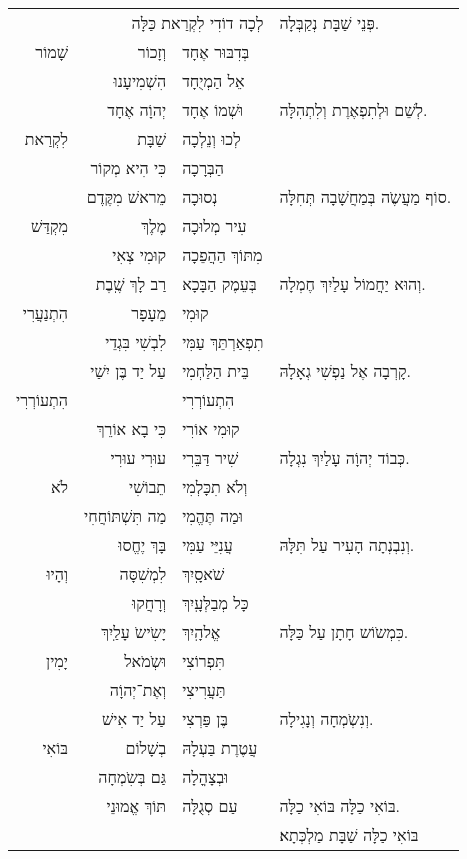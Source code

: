 \documentclass[12pt,letterpaper]{siddur}
\begin{document}
\begin{longtable}[r]{r r l l}
&\multicolumn{2}{r}{לְכָה דוֹדִי לִקְרַאת כַּלָּה} & פְּנֵי שַׁבָּת נְקַבְּלָה.\\
שָׁמוֹר & וְזָכוֹר & בְּדִבּוּר אֶחָד &\\
& הִשְׁמִיעָנוּ & אֵל הַמְיֻחָד &\\
& יְהוָֹה אֶחָד & וּשְׁמוֹ אֶחָד & לְשֵׁם וּלְתִפְאֶרֶת וְלִתְהִלָּה.\\
לִקְרַאת & שַׁבָּת & לְכוּ וְנֵלְכָה\\
&כִּי הִיא מְקוֹר & הַבְּרָכָה\\
&מֵראשׁ מִקֶּדֶם & נְסוּכָה & סוֹף מַעֲשֶֹה בְּמַחֲשָׁבָה תְּחִלָּה.\\
מִקְדַּשׁ & מֶלֶךְ & עִיר מְלוּכָה &\\
& קוּמִי צְאִי & מִתּוֹךְ הַהֲפֵכָה &\\
& רַב לָךְ שֶֽׁבֶת & בְּעֵמֶק הַבָּכָא & וְהוּא יַחֲמוֹל עָלַיִךְ חֶמְלָה.\\
הִתְנַעֲרִי & מֵעָפָר & קוּמִי &\\
& לִבְשִׁי בִּגְדֵי & תִפְאַרְתֵּךְ עַמִּי &\\
& עַל יַד בֶּן יִשַׁי & בֵּית הַלַּחְמִי & קָרְבָה אֶל נַפְשִׁי גְאָלָהּ.\\
הִתְעוֹרְרִי && הִתְעוֹרְרִי\\
& כִּי בָא אוֹרֵךְ & קוּמִי אוֹרִי &\\
& עוּרִי עוּרִי & שִׁיר דַּבֵּרִי & כְּבוֹד יְהוָֹה עָלַיִךְ נִגְלָה.\\
לֹא & תֵבוֹשִׁי & וְלֹא תִכָּלְמִי &\\
& מַה תִּשְׁתּוֹחֲחִי & וּמַה תֶּהֱמִי &\\
& בָּךְ יֶחֱסוּ & עֲנִיֵּי עַמִּי & וְנִבְנְתָה הָעִיר עַל תִּלָּהּ.\\
וְהָיוּ & לִמְשִׁסָּה & שֹׁאסָֽיִךְ &\\
& וְרָחֲקוּ & כָּל מְבַלְּעָֽיִךְ &\\
& יָשִֹישֹ עָלַֽיִךְ & אֱלהָֽיִךְ & כִּמְשֹוֹש חָתָן עַל כַּלָּה.\\
יָמִין & וּשְֹמֹאל & תִּפְרוֹצִי &\\
& וְאֶת־יְהוָֹה & תַּעֲרִיצִי &\\
& עַל יַד אִישׁ & בֶּן פַּרְצִי & וְנִשְֹמְחָה וְנָגִילָה.\\
בּוֹאִי & בְשָׁלוֹם & עֲטֶרֶת בַּעְלָהּ &\\
& גַּם בְּשִֹמְחָה & וּבְצָהֳלָה &\\
& תּוֹךְ אֱמוּנֵי & עַם סְגֻלָּה & בּוֹאִי כַלָּה בּוֹאִי כַלָּה.\\
&&& בּוֹאִי כַלָּה שַׁבָּת מַלְכְּתָא׃
\end{longtable}
\end{document}
